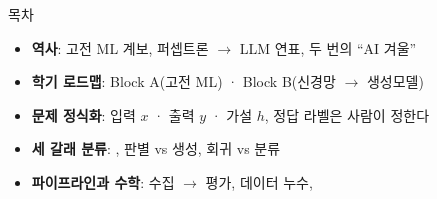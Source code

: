 \renewcommand{\ksacredit}{}

\begin{frame}{목차}
  \small
  \begin{itemize}
    \item \textbf{역사}: 고전 ML 계보, 퍼셉트론 $\to$ LLM 연표, 두 번의 ``AI 겨울''
    \item \textbf{학기 로드맵}: Block A(고전 ML) · Block B(신경망 $\to$ 생성모델)
    \item \textbf{문제 정식화}: 입력 $x$ · 출력 $y$ · 가설 $h$, 정답 라벨은 사람이 정한다
    \item \textbf{세 갈래 분류}: , 판별 vs 생성, 회귀 vs 분류
    \item \textbf{파이프라인과 수학}: 수집 $\to$ 평가, 데이터 누수, 
  \end{itemize}
\end{frame}
